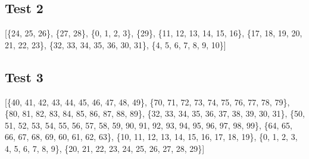 \documentclass{article}
\begin{document}
\subsection{Test 2}
    \begin{center}
    \end{center}
    [\{24, 25, 26\}, \{27, 28\}, \{0, 1, 2, 3\}, \{29\}, \{11, 12, 13, 14, 15, 16\}, \{17, 18, 19, 20, 21, 22, 23\}, \{32, 33, 34, 35, 36, 30, 31\}, \{4, 5, 6, 7, 8, 9, 10\}]
\subsection{Test 3}
    \begin{center}
    \end{center}
    [\{40, 41, 42, 43, 44, 45, 46, 47, 48, 49\}, \{70, 71, 72, 73, 74, 75, 76, 77, 78, 79\}, \{80, 81, 82, 83, 84, 85, 86, 87, 88, 89\}, \{32, 33, 34, 35, 36, 37, 38, 39, 30, 31\}, \{50, 51, 52, 53, 54, 55, 56, 57, 58, 59, 90, 91, 92, 93, 94, 95, 96, 97, 98, 99\}, \{64, 65, 66, 67, 68, 69, 60, 61, 62, 63\}, \{10, 11, 12, 13, 14, 15, 16, 17, 18, 19\}, \{0, 1, 2, 3, 4, 5, 6, 7, 8, 9\}, \{20, 21, 22, 23, 24, 25, 26, 27, 28, 29\}]
\end{document}
